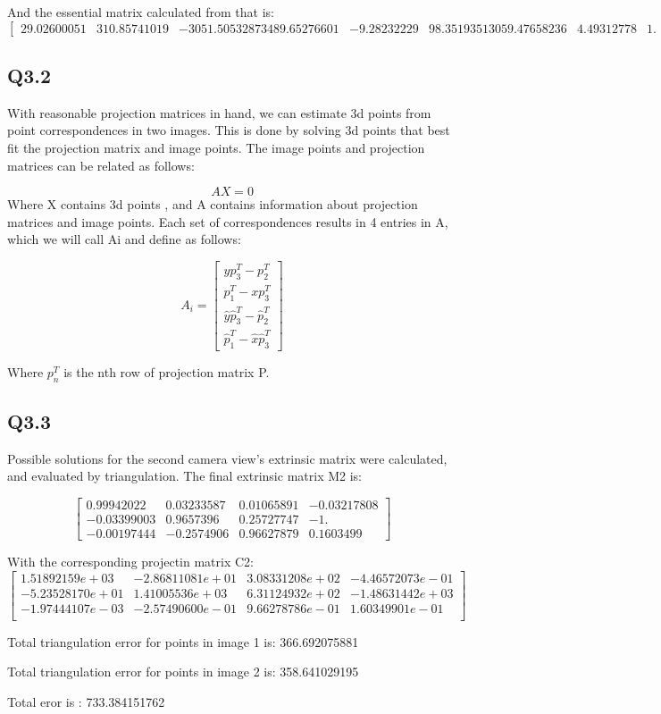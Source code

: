 \documentclass[12pt]{article}
\begin{document}
And the essential matrix calculated from that is:
$$
\begin{bmatrix}
29.02600051   &  310.85741019 & -3051.50532873
489.65276601  &  -9.28232229  & 98.3519351
3059.47658236 &    4.49312778 &    1.       
\end{bmatrix}
$$

\newpage
\subsection{Q3.2}
With reasonable projection matrices in hand, we can estimate 3d points from point correspondences in two images.  This is done by solving 3d points that best fit the projection matrix and image points.
The image points and projection matrices can be related as follows:  
  
$$
AX = 0
$$
Where X contains 3d points , and A contains information about projection matrices and image points. Each set of correspondences results in 4 entries in A, which we will call Ai and define as follows:

$$
A_{i} = 
\begin{bmatrix}
y p_{3}^{T} - p_{2}^{T} \\
p_{1}^{T} - x p_{3}^{T} \\
\hat{y} \hat{p}_{3}^{T} - \hat{p}_{2}^{T} \\
\hat{p}_{1}^{T} - \hat{x} \hat{p}_{3}^{T} 
\end{bmatrix}
$$
  
Where $p_{n}^{T}$ is the nth row of projection matrix P.

\newpage
\subsection{Q3.3}
Possible solutions for the second camera view's extrinsic matrix were calculated, and evaluated by triangulation.
The final extrinsic matrix M2 is:
  
$$
\begin{bmatrix}
0.99942022& 0.03233587& 0.01065891& -0.03217808 \\
-0.03399003& 0.9657396& 0.25727747& -1.         \\
-0.00197444& -0.2574906& 0.96627879& 0.1603499
\end{bmatrix}
$$
  
With the corresponding projectin matrix C2:
$$
\begin{bmatrix}
1.51892159e+03& -2.86811081e+01& 3.08331208e+02& -4.46572073e-01 \\
-5.23528170e+01& 1.41005536e+03& 6.31124932e+02& -1.48631442e+03 \\
-1.97444107e-03& -2.57490600e-01& 9.66278786e-01& 1.60349901e-01 \\
\end{bmatrix}
$$
  
Total triangulation error for points in image 1 is: 366.692075881  
  
Total triangulation error for points in image 2 is: 358.641029195  
  
Total eror is : 733.384151762  
  
\end{document}
